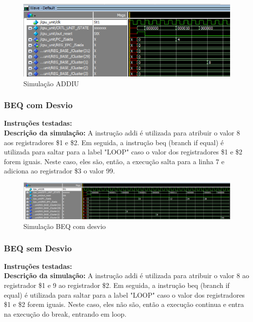 \begin{figure}[htbp!]
\centering
\includegraphics[width=1\textwidth]{figure/simulacao_addiu.png}
\caption{Simulação ADDIU} 
\label{fig:imagem_massa}
\end{figure}

\newpage

\subsubsection{BEQ com Desvio}
\textbf{Instruções testadas:}
 \\

\textbf{Descrição da simulação:} A instrução addi é utilizada para atribuir o valor 8 aos registradores \$1 e \$2. Em seguida, a instrução beq (branch if equal) é utilizada para saltar para a label "LOOP" caso o valor dos registradores \$1 e \$2 forem iguais. Neste caso, eles são, então, a execução salta para a linha 7 e adiciona ao registrador \$3 o valor 99. \\

\begin{figure}[htbp!]
\centering
\includegraphics[width=1\textwidth]{figure/simulacao_beq_desvio.png}
\caption{Simulação BEQ com desvio} 
\label{fig:imagem_massa}
\end{figure}

\subsubsection{BEQ sem Desvio}
\textbf{Instruções testadas:}
 \\

\textbf{Descrição da simulação:} A instrução addi é utilizada para atribuir o valor 8 ao registrador \$1 e 9 ao registrador \$2. Em seguida, a instrução beq (branch if equal) é utilizada para saltar para a label "LOOP" caso o valor dos registradores \$1 e \$2 forem iguais. Neste caso, eles não são, então a execução continua e entra na execução do break, entrando em loop. \\

